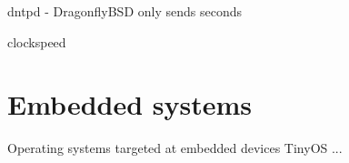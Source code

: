 dntpd - DragonflyBSD
only sends seconds


clockspeed

\section{Embedded systems}
Operating systems targeted at embedded devices
TinyOS
...
